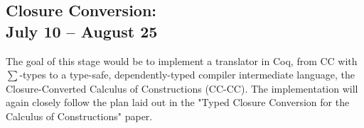 \documentclass[manuscript]{acmart}
\begin{document}
\subsection[Closure Conversion\\ July 10 -- August 25]{Closure Conversion:\\ \large{July 10 -- August 25}}
The goal of this stage would be to implement a translator in Coq, from CC with $\sum$-types to a type-safe, dependently-typed compiler intermediate language, the Closure-Converted Calculus of Constructions (CC-CC). The implementation will again closely follow the plan laid out in the "Typed Closure Conversion for the Calculus of Constructions" paper. 



\end{document}
